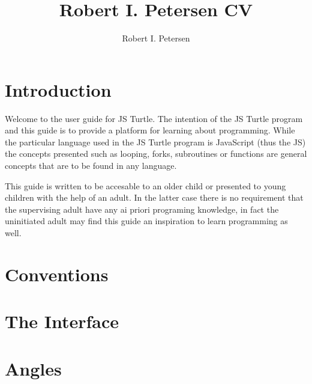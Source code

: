 \documentclass[letterpaper]{article}
\author{Robert I. Petersen}
\title{Robert I. Petersen CV}
\begin{document}
\section{Introduction}
Welcome to the user guide for JS Turtle.  The intention of
the JS Turtle program and this guide is to provide a platform for learning
about programming.  While the particular language used in the JS Turtle program
is JavaScript (thus the JS) the concepts presented such as looping, forks,
subroutines or functions are general concepts that are to be found in any
language.

This guide is written to be accesable to an older child or presented to young
children with the help of an adult.  In the latter case there is no requirement
that the supervising adult have any ai priori programing knowledge, in fact the
uninitiated adult may find this guide an inspiration to learn programming as
well.

\section{Conventions}

\section{The Interface}

\section{Angles}
\end{document}

